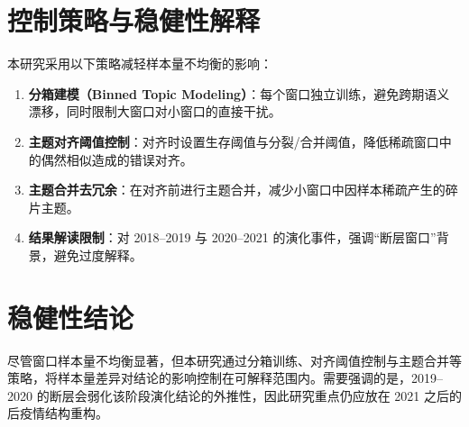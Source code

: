 \documentclass[11pt,a4paper]{article}
\begin{document}
\section{控制策略与稳健性解释}

本研究采用以下策略减轻样本量不均衡的影响：

\begin{enumerate}
    \item \textbf{分箱建模（Binned Topic Modeling）}：每个窗口独立训练，避免跨期语义漂移，同时限制大窗口对小窗口的直接干扰。
    \item \textbf{主题对齐阈值控制}：对齐时设置生存阈值与分裂/合并阈值，降低稀疏窗口中的偶然相似造成的错误对齐。
    \item \textbf{主题合并去冗余}：在对齐前进行主题合并，减少小窗口中因样本稀疏产生的碎片主题。
    \item \textbf{结果解读限制}：对 2018--2019 与 2020--2021 的演化事件，强调“断层窗口”背景，避免过度解释。
\end{enumerate}

\section{稳健性结论}

尽管窗口样本量不均衡显著，但本研究通过分箱训练、对齐阈值控制与主题合并等策略，将样本量差异对结论的影响控制在可解释范围内。需要强调的是，2019--2020 的断层会弱化该阶段演化结论的外推性，因此研究重点仍应放在 2021 之后的后疫情结构重构。
\end{document}
